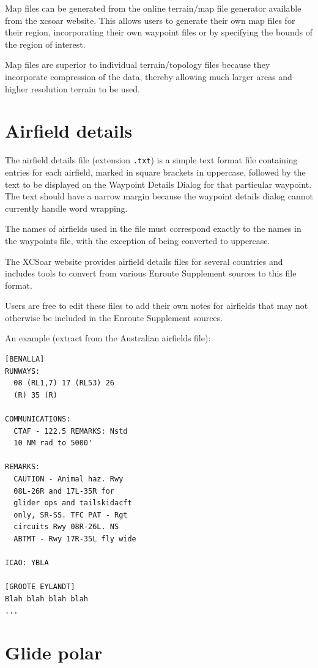 \documentclass[a4paper,12pt]{refrep}
\begin{document}
Map files can be generated from the online terrain/map file generator
available from the xcsoar website.  This allows users to generate
their own map files for their region, incorporating their own waypoint
files or by specifying the bounds of the region of interest.

Map files are superior to individual terrain/topology files because
they incorporate compression of the data, thereby allowing much larger
areas and higher resolution terrain to be used.

\section{Airfield details}

The airfield details file (extension \verb|.txt|) is a simple text
format file containing entries for each airfield, marked in square
brackets in uppercase, followed by the text to be displayed on the
Waypoint Details Dialog for that particular waypoint.  The text should
have a narrow margin because the waypoint details dialog cannot
currently handle word wrapping.

The names of airfields used in the file must correspond exactly to the
names in the waypoints file, with the exception of being converted to
uppercase.

The XCSoar website provides airfield details files for several
countries and includes tools to convert from various Enroute
Supplement sources to this file format.

Users are free to edit these files to add their own notes for
airfields that may not otherwise be included in the Enroute Supplement
sources.

An example (extract from the Australian airfields file):
\begin{verbatim}
[BENALLA]
RUNWAYS:
  08 (RL1,7) 17 (RL53) 26
  (R) 35 (R)

COMMUNICATIONS:
  CTAF - 122.5 REMARKS: Nstd
  10 NM rad to 5000'

REMARKS:
  CAUTION - Animal haz. Rwy
  08L-26R and 17L-35R for
  glider ops and tailskidacft
  only, SR-SS. TFC PAT - Rgt
  circuits Rwy 08R-26L. NS
  ABTMT - Rwy 17R-35L fly wide

ICAO: YBLA

[GROOTE EYLANDT]
Blah blah blah blah
...
\end{verbatim}

\section{Glide polar}
\end{document}
